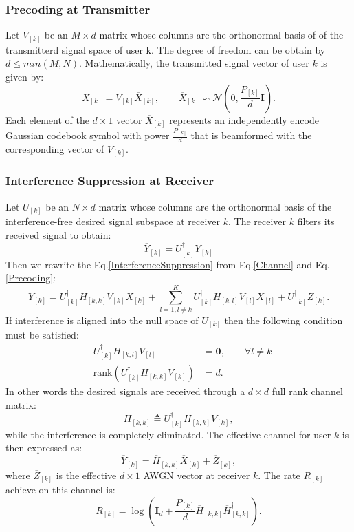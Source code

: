 \documentclass[12pt, onecolumn]{IEEEtran}
\begin{document}
\subsubsection{Precoding at Transmitter}
Let $V_{[k]}$ be an $M\times{}d$ matrix whose columns are the orthonormal basis of of the transmitterd signal space of user k. The degree of freedom can be obtain by $d \leq{} min(M,N)$. Mathematically, the transmitted signal vector of user $k$ is given by:
\begin{equation}\label{Precoding}
    X_{[k]} = V_{[k]}\overline{X}_{[k]}, \qquad \overline{X}_{[k]} \backsim \mathcal{N}(0,\frac{P_{[k]}}{d}\mathbf{I}).
\end{equation}
Each element of the $d\times{}1$ vector $\overline{X}_{[k]}$  represents an independently encode Gaussian codebook symbol with power $\frac{P_{[k]}}{d}$ that is beamformed with the corresponding vector of $V_{[k]}$.


\subsubsection{Interference Suppression at Receiver}
Let $U_{[k]}$ be an $N\times{}d$ matrix whose columns are the orthonormal basis of the interference-free desired signal subspace at receiver $k$. The receiver $k$ filters its  received signal to obtain:
\begin{equation}\label{InterferenceSuppression}
\overline{Y}_{[k]} = U_{[k]}^{\dag}Y_{[k]}
\end{equation}
Then we rewrite the Eq.\eqref{InterferenceSuppression} from Eq.\eqref{Channel} and Eq.\eqref{Precoding}:
\begin{equation}
    \overline{Y}_{[k]} = U_{[k]}^{\dag}H_{[k,k]}V_{[k]}\overline{X}_{[k]} + \sum_{l=1,l\neq{}k}^{K}U_{[k]}^{\dag}H_{[k,l]}V_{[l]}\overline{X}_{[l]} + U_{[k]}^{\dag}Z_{[k]}.
\end{equation}
If  interference is aligned into the null space of $U_{[k]}$ then the following condition must be satisfied:
\begin{eqnarray}
    & U_{[k]}^{\dag}H_{[k,l]}V_{[l]} &= \textbf{0}, \qquad{} \forall l\neq{}k \label{constraint 1} \\
    & \text{rank}(U_{[k]}^{\dag}H_{[k,k]}V_{[k]}) &= d. \label{constraint 2}
\end{eqnarray}
In other words the desired signals are received through a $d\times{}d$ full rank channel matrix:
\begin{equation}
\overline{H}_{[k,k]} \triangleq U_{[k]}^{\dag}H_{[k,k]}V_{[k]},
\end{equation}
while the interference is completely eliminated. The effective channel for user $k$ is then expressed as:
\begin{equation}
\overline{Y}_{[k]}=\overline{H}_{[k,k]} \overline{X}_{[k]}+\overline{Z}_{[k]},
\end{equation}
where $\overline{Z}_{[k]}$ is the effective $d\times{}1$ AWGN vector at receiver $k$. The rate $R_{[k]}$ achieve on this channel is:
\begin{equation}
R_{[k]} = \log(\textbf{I}_{d} + \frac{P_{[k]}}{d}\overline{H}_{[k,k]}\overline{H}_{[k,k]}^{\dag}).
\end{equation}
\end{document}

